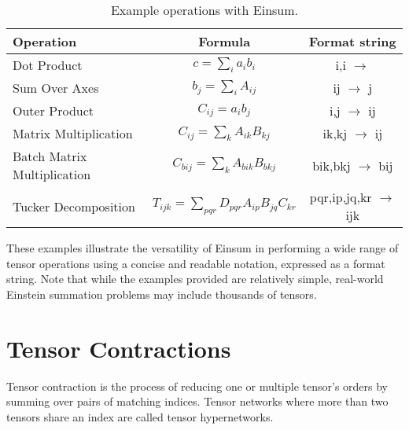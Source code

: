 \begin{table}[hbp]
    \caption{Example operations with Einsum.}
    \label{tab:einsum:ops}
    \centering
    \def\arraystretch{1.1}
    \begin{tabular}{lcc}
        \toprule
        \textbf{Operation}                 & \textbf{Formula}                                    & \textbf{Format string}         \\
        \midrule
        Dot Product                        & $c = \sum_{i} a_{i} b_{i}$                          & i,i $\rightarrow$              \\
        Sum Over Axes                      & $b_{j} = \sum_{i} A_{ij}$                           & ij $\rightarrow$ j             \\
        Outer Product                      & $C_{ij} = a_{i} b_{j}$                              & i,j $\rightarrow$ ij           \\
        Matrix Multiplication              & $C_{ij} = \sum_{k} A_{ik} B_{kj}$                   & ik,kj $\rightarrow$ ij         \\
        Batch Matrix Multiplication        & $C_{bij} = \sum_{k} A_{bik} B_{bkj}$                & bik,bkj $\rightarrow$ bij      \\
        Tucker Decomposition \cite{tucker} & $T_{ijk} = \sum_{pqr} D_{pqr} A_{ip} B_{jq} C_{kr}$ & pqr,ip,jq,kr $\rightarrow$ ijk \\
        \bottomrule
    \end{tabular}
\end{table}

\noindent
These examples illustrate the versatility of Einsum in performing a wide range of 
tensor operations using a concise and readable notation, expressed as a format string.
Note that while the examples provided are relatively simple, real-world Einstein
summation problems may include thousands of tensors.

\section{Tensor Contractions}
\label{sec:tensor:contractions}
Tensor contraction is the process of reducing one or multiple tensor's orders by summing 
over pairs of matching indices. Tensor networks where more than two tensors share an index
are called tensor hypernetworks.

